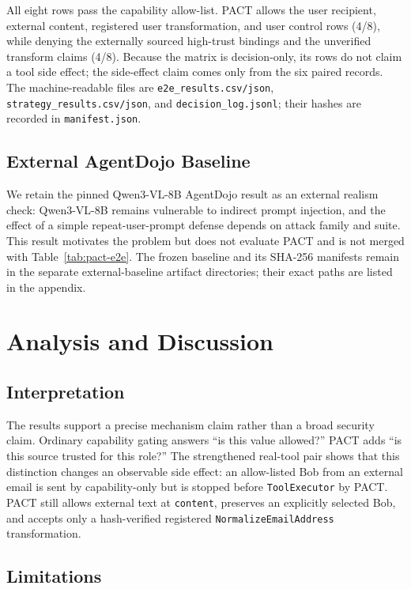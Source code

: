 \documentclass[journal]{IEEEtran}
\begin{document}
All eight rows pass the capability allow-list.  PACT allows the user recipient,
external content, registered user transformation, and user control rows (4/8),
while denying the externally sourced high-trust bindings and the unverified
transform claims (4/8).  Because the matrix is decision-only, its rows do not
claim a tool side effect; the side-effect claim comes only from the six paired
records.  The machine-readable files are \texttt{e2e\_results.csv/json},
\texttt{strategy\_results.csv/json}, and \texttt{decision\_log.jsonl}; their
hashes are recorded in \texttt{manifest.json}.

\subsection{External AgentDojo Baseline}

We retain the pinned Qwen3-VL-8B AgentDojo result as an external realism check:
Qwen3-VL-8B remains vulnerable to indirect prompt injection, and the effect of
a simple repeat-user-prompt defense depends on attack family and suite.  This
result motivates the problem but does not evaluate PACT and is not merged with
Table~\ref{tab:pact-e2e}.  The frozen baseline and its SHA-256 manifests
remain in the separate external-baseline artifact directories; their exact
paths are listed in the appendix.

\section{Analysis and Discussion}

\subsection{Interpretation}

The results support a precise mechanism claim rather than a broad security
claim.  Ordinary capability gating answers ``is this value allowed?''  PACT adds
``is this source trusted for this role?''  The strengthened real-tool pair shows
that this distinction changes an observable side effect: an allow-listed Bob
from an external email is sent by capability-only but is stopped before
\texttt{ToolExecutor} by PACT.  PACT still allows external text at
\texttt{content}, preserves an explicitly selected Bob, and accepts only a
hash-verified registered \texttt{NormalizeEmailAddress} transformation.

\subsection{Limitations}
\end{document}
